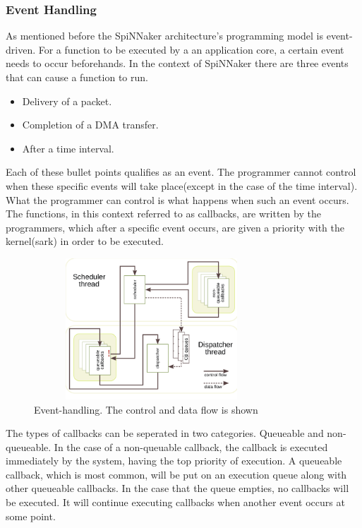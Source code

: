 \documentclass[12pt,a4paper]{article}
\begin{document}
\subsubsection{Event Handling}
As mentioned before the SpiNNaker architecture's programming model is event-driven. For a function to be executed by a an application core, a certain event needs to occur beforehands. In the context of SpiNNaker there are three events that can cause a function to run.
\begin{itemize}
\item Delivery of a packet.
\item Completion of a DMA transfer.
\item After a time interval.
\end{itemize}
Each of these bullet points qualifies as an event. The programmer cannot control when these specific events will take place(except in the case of the time interval). What the programmer can control is what happens when such an event occurs. The functions, in this context referred to as callbacks, are written by the programmers, which after a specific event occurs, are given a priority with the kernel(sark) in order to be executed. 
\begin{figure}[h!]
\includegraphics[width=250pt,height=150pt,scale=2]{Pics/event-handling.png}
\centering
\caption{Event-handling. The control and data flow is shown\cite{sharp2011event}}
\end{figure}

The types of callbacks can be seperated in two categories. Queueable and non-queueable. In the case of a non-queuable callback, the callback is executed immediately by the system, having the top priority of execution. A queueable callback, which is most common, will be put on an execution queue along with other queueable callbacks. In the case that the queue empties, no callbacks will be executed. It will continue executing callbacks when another event occurs at some point\cite{sharp2011event}\cite{rast2012managing}. 
	
\end{document}
